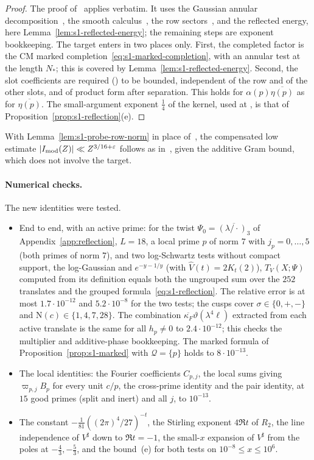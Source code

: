 \documentclass[11pt]{article}
\numberwithin{equation}{section}
\newcommand{\N}{\mathrm N}
\begin{document}
\begin{proof}
The proof of~\cite[Lemma~15.1]{OAI78} applies verbatim. It uses the Gaussian annular
decomposition~\cite[Lemma~4.6]{OAI78}, the smooth calculus~\cite[Lemma~4.5]{OAI78},
the row sectors~\cite[Lemma~5.2]{OAI78}, and the reflected energy, here
Lemma~\ref{lem:s1-reflected-energy}; the remaining steps are exponent bookkeeping. The target enters in two places
only. First, the completed factor is the CM marked completion~\eqref{eq:s1-marked-completion}, with an annular test
at the length $N_*$; this is covered by Lemma~\ref{lem:s1-reflected-energy}. Second, the slot coefficients are
required (\cite[proof of Lemma~15.1]{OAI78}) to be bounded, independent of the row and of the other slots, and of product form after
separation. This holds for $\alpha(p)\overline{\eta(p)}$ as for $\overline{\eta(p)}$. The small-argument exponent
$\frac14$ of the kernel, used at \cite[proof of Lemma~15.1]{OAI78}, is that of Proposition~\ref{prop:s1-reflection}(e).
\end{proof}

With Lemma~\ref{lem:s1-probe-row-norm} in place of~\cite[Lemma~15.1]{OAI78}, the compensated low
estimate $|I_{\rm mod}(Z)|\ll Z^{3/16+\varepsilon}$ follows as in~\cite[Prop.~15.3]{OAI78}, given the additive Gram
bound, which does not involve the target.

\paragraph{Numerical checks.} The new identities were tested.
\begin{itemize}
\item End to end, with an active prime: for the twist $\Psi_0=\overline{(\lambda/\cdot)_3}$ of
 Appendix~\ref{app:reflection}, $L=18$, a local prime $p$ of norm $7$ with $j_p=0,\dots,5$ (both primes of norm $7$),
 and two log-Schwartz tests without compact support, the log-Gaussian and $e^{-y-1/y}$ (with
 $\widehat V(t)=2K_t(2)$), $T_V(X;\Psi)$ computed from its definition equals both the ungrouped sum over the $252$
 translates and the grouped formula~\eqref{eq:s1-reflection}. The relative error is at most $1.7\cdot10^{-12}$ and
 $5.2\cdot10^{-8}$ for the two tests; the cusps cover $\sigma\in\{0,+,-\}$ and $\N(c)\in\{1,4,7,28\}$. The
 combination $\overline{\kappa_F}\vartheta(\lambda^4\ell)$ extracted from each active translate is the same for all
 $h_p\ne0$ to $2.4\cdot10^{-12}$; this checks the multiplier and additive-phase bookkeeping. The marked formula of
 Proposition~\ref{prop:s1-marked} with $\mathcal Q=\{p\}$ holds to $8\cdot10^{-13}$.
\item The local identities: the Fourier coefficients $C_{p,j}$, the local sums giving $\varpi_{p,j}B_p$ for every unit
 $c/p$, the cross-prime identity and the pair identity, at $15$ good primes (split and inert) and all $j$, to
 $10^{-13}$.
\item The constant $-\frac1{81}((2\pi)^4/27)^{-t}$, the
 Stirling exponent $4\Re t$ of $R_2$, the line independence of $V^\sharp$ down to $\Re t=-1$, the small-$x$ expansion
 of $V^\sharp$ from the poles at $-\frac43,-\frac53$, and the
 bound~(e) for both tests on $10^{-8}\le x\le10^6$.
\end{itemize}
\end{document}
